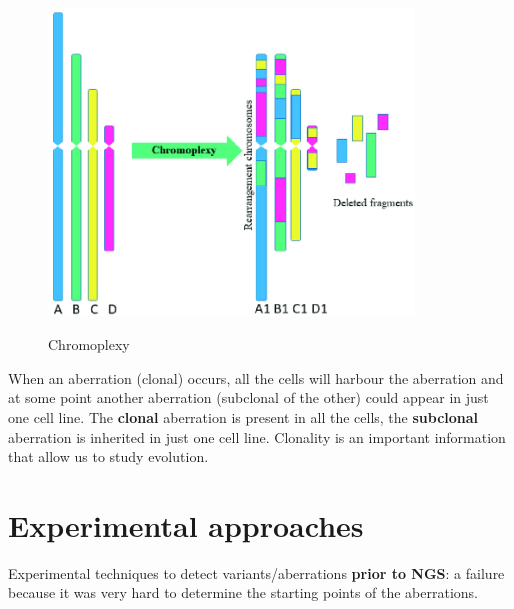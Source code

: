 \begin{figure}[H]
  \includegraphics[width=3.81944in,height=3.21433in]{image8.png}\\
  \centering
  \caption{Chromoplexy}
  \label{fig: Chromoplexy}
\end{figure}


When an aberration (clonal) occurs, all the cells will harbour the aberration
and at some point another aberration (subclonal of the other) could appear in
just one cell line. The \textbf{clonal} aberration is present in all the cells,
the \textbf{subclonal} aberration is inherited in just one cell line. Clonality
is an important information that allow us to study evolution.


\hypertarget{experimental-approaches}{%
\section{Experimental approaches}\label{experimental-approaches}}


Experimental techniques to detect variants/aberrations \textbf{prior to NGS}: a
failure because it was very hard to determine the starting points of the
aberrations. %

